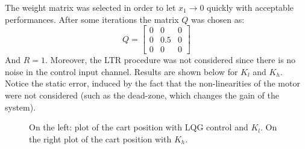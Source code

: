 The weight matrix was selected in order to let $x_1 \to 0$ quickly with acceptable performances. After some iterations the matrix $Q$ was chosen as:
\begin{equation}
Q = \begin{bmatrix}
0 & 0 & 0 \\ 0 & 0.5 & 0 \\ 0 & 0 &0 
\end{bmatrix}
\end{equation}
And $R=1$. Moreover, the LTR procedure was not considered since there is no noise in the control input channel.
Results are shown below for $K_l$ and $K_h$. Notice the static error, induced by the fact that the non-linearities of the motor were not considered (such as the dead-zone, which changes the gain of the system).
  \begin{figure}[!tbh]
  \centering
  \hfill
  \caption{On the left: plot of the cart position with LQG control and $K_l$. On the right plot of the cart position with $K_h$.}
    \label{fig:lqg1dof}
\end{figure}